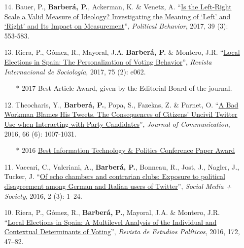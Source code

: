 \documentclass[margin,line,11pt]{resume}
\begin{document}
\begin{resume}
\begin{itemize}[leftmargin=5.5mm]
\item[14.] Bauer, P., \textbf{Barber\'{a}, P.}, Ackerman, K. \& Venetz, A. ``\href{http://link.springer.com/article/10.1007/s11109-016-9368-2}{Is the Left-Right Scale a Valid Measure of Ideology? Investigating the Meaning of `Left' and `Right' and Its Impact on Measurement}'', \textit{Political Behavior}, 2017, 39 (3): 553-583.

\item[13.] Riera, P., G\'{o}mez, R., Mayoral, J.A. \textbf{Barber\'{a}, P.} \& Montero, J.R. ``\href{http://revintsociologia.revistas.csic.es/index.php/revintsociologia/article/view/675/832}{Local Elections in Spain: The Personalization of Voting Behavior}'', \textit{Revista Internacional de Sociolog\'{i}a}, 2017, 75 (2): e062.
\begin{itemize}
\item[] $\ast$ 2017 Best Article Award, given by the Editorial Board of the journal.
\end{itemize}

    
\item[12.] Theocharis, Y., \textbf{Barber\'{a}, P.}, Popa, S., Fazekas, Z. \& Parnet, O. ``\href{http://onlinelibrary.wiley.com/doi/10.1111/jcom.12259/abstract}{A Bad Workman Blames His Tweets. The Consequences of Citizens' Uncivil Twitter Use when Interacting with Party Candidates}'', \textit{Journal of Communication}, 2016, 66 (6): 1007-1031.
\begin{itemize}
\item[] $\ast$ 2016 \href{http://www.apsanet.org/section-18-best-conference-paper-award}{Best Information Technology \& Politics Conference Paper Award}
\end{itemize}

    
\item[11.] Vaccari, C., Valeriani, A., \textbf{Barber\'{a}, P.}, Bonneau, R., Jost, J., Nagler, J., Tucker, J. ``\href{http://sms.sagepub.com/content/2/3/2056305116664221.abstract}{Of echo chambers and contrarian clubs: Exposure to political disagreement among German and Italian users of Twitter}'', \textit{Social Media + Society}, 2016, 2 (3): 1--24.

\item[10.] Riera, P., G\'{o}mez, R., \textbf{Barber\'{a}, P.}, Mayoral, J.A. \& Montero, J.R. ``\href{http://www.cepc.gob.es/publicaciones/revistas/revistaselectronicas?IDR=3&IDN=1360&IDA=37721}{Local Elections in Spain: A Multilevel Analysis of the Individual and Contextual Determinants of Voting}'', \textit{Revista de Estudios Pol\'{i}ticos}, 2016, 172, 47--82.


\end{itemize}
\end{resume}
\end{document}
